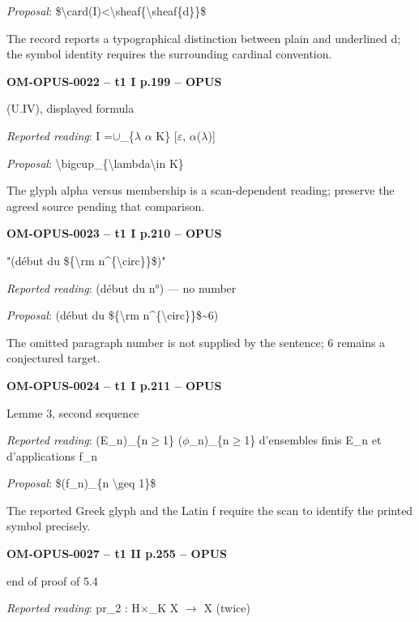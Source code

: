 \emph{Proposal}: \$\textbackslash{}card(I)<\textbackslash{}sheaf\{\textbackslash{}sheaf\{d\}\}\$\par
The record reports a typographical distinction between plain and underlined d; the symbol identity requires the surrounding cardinal convention.\par
\par\noindent\textbf{OM-OPUS-0022 -- t1 I p.199 -- OPUS}\par
(U.IV), displayed formula\par
\emph{Reported reading}: I =\allowbreak  \ensuremath{\cup}\_\{\ensuremath{\lambda} \ensuremath{\alpha} K\} [\ensuremath{\varepsilon}, \ensuremath{\alpha}(\ensuremath{\lambda})]\par
\emph{Proposal}: \textbackslash{}bigcup\_\{\textbackslash{}lambda\textbackslash{}in K\}\par
The glyph alpha versus membership is a scan-dependent reading; preserve the agreed source pending that comparison.\par
\par\noindent\textbf{OM-OPUS-0023 -- t1 I p.210 -- OPUS}\par
"(début du \$\{\textbackslash{}rm n\textasciicircum{}\{\textbackslash{}circ\}\}\$)"\par
\emph{Reported reading}: (début du n°) — no number\par
\emph{Proposal}: (début du \$\{\textbackslash{}rm n\textasciicircum{}\{\textbackslash{}circ\}\}\$\textasciitilde{}6)\par
The omitted paragraph number is not supplied by the sentence; 6 remains a conjectured target.\par
\par\noindent\textbf{OM-OPUS-0024 -- t1 I p.211 -- OPUS}\par
Lemme 3, second sequence\par
\emph{Reported reading}: (E\_n)\_\{n\ensuremath{\geq}1\} (\ensuremath{\phi}\_n)\_\{n\ensuremath{\geq}1\} d'ensembles finis E\_n et d'applications f\_n\par
\emph{Proposal}: \$(f\_n)\_\{n \textbackslash{}geq 1\}\$\par
The reported Greek glyph and the Latin f require the scan to identify the printed symbol precisely.\par
\par\noindent\textbf{OM-OPUS-0027 -- t1 II p.255 -- OPUS}\par
end of proof of 5.4\par
\emph{Reported reading}: pr\_2 : H\ensuremath{\times}\_K X \ensuremath{\to} X (twice)\par
